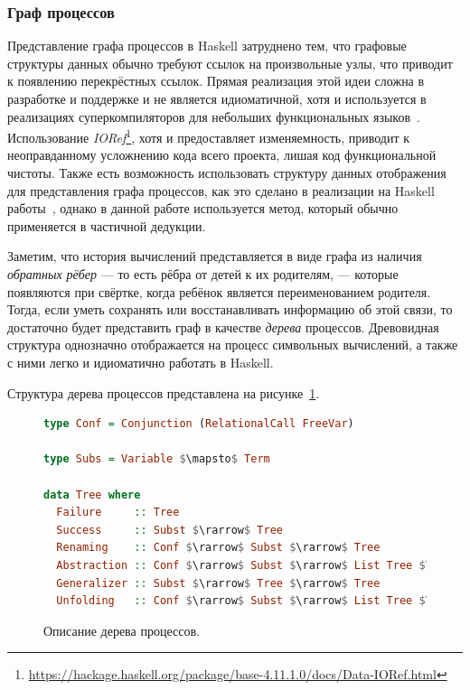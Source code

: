 \subsubsection{Граф процессов}

Представление графа процессов в Haskell затруднено тем, что графовые
структуры данных обычно требуют ссылок на произвольные узлы,
что приводит к появлению перекрёстных ссылок. Прямая реализация этой
идеи сложна в разработке и поддержке и не является идиоматичной, хотя и используется
в реализациях суперкомпиляторов для небольших функциональных языков~\cite{scmini}.
Использование \emph{IORef}\footnote{\url{https://hackage.haskell.org/package/base-4.11.1.0/docs/Data-IORef.html}},
хотя и предоставляет изменяемность, приводит к неоправданному усложнению кода всего
проекта, лишая код функциональной чистоты. Также есть возможность использовать
структуру данных отображения для представления графа процессов, как это сделано
в реализации на Haskell работы~\cite{simplesc}, однако в данной работе используется
метод, который обычно применяется в частичной дедукции.

Заметим, что история вычислений представляется в виде графа из наличия
\emph{обратных рёбер}
--- то есть рёбра от детей к их родителям, --- которые появляются при свёртке,
когда ребёнок является переименованием родителя.
Тогда, если уметь сохранять или восстанавливать информацию об этой связи, то
достаточно будет представить граф в качестве \emph{дерева} процессов.
Древовидная структура однозначно отображается на процесс символьных вычислений,
а также с ними легко и идиоматично работать в Haskell.

Структура дерева процессов представлена на рисунке~\ref{fig:ptree}.

\begin{figure}[h!]
\begin{lstlisting}[mathescape,language=Haskell,extendedchars=\true,frame=single,basicstyle=\ttfamily]
type Conf = Conjunction (RelationalCall FreeVar)

type Subs = Variable $\mapsto$ Term

data Tree where
  Failure     :: Tree
  Success     :: Subst $\rarrow$ Tree
  Renaming    :: Conf $\rarrow$ Subst $\rarrow$ Tree
  Abstraction :: Conf $\rarrow$ Subst $\rarrow$ List Tree $\rarrow$ Tree
  Generalizer :: Subst $\rarrow$ Tree $\rarrow$ Tree
  Unfolding   :: Conf $\rarrow$ Subst $\rarrow$ List Tree $\rarrow$ Tree
\end{lstlisting}
\caption{Описание дерева процессов.}
\label{fig:ptree}
\end{figure}

